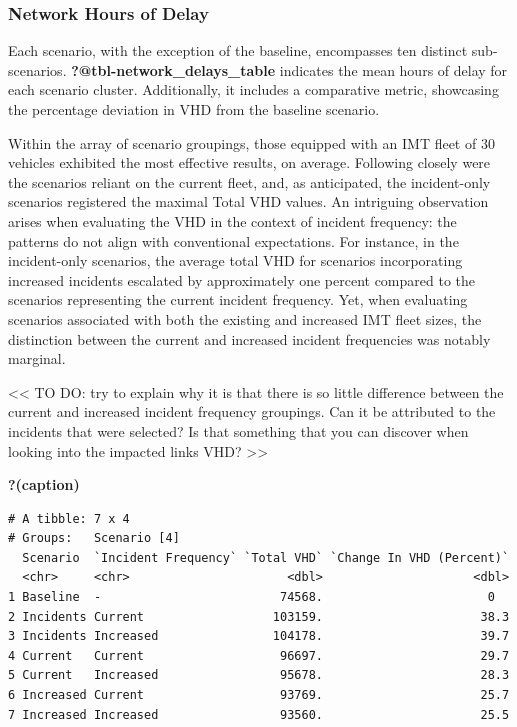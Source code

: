 \documentclass[
  letterpaper,
  authoryear]{elsarticle}
\begin{document}
\hypertarget{network-hours-of-delay}{%
\subsubsection{Network Hours of Delay}\label{network-hours-of-delay}}

Each scenario, with the exception of the baseline, encompasses ten
distinct sub-scenarios. \textbf{?@tbl-network\_delays\_table} indicates
the mean hours of delay for each scenario cluster. Additionally, it
includes a comparative metric, showcasing the percentage deviation in
VHD from the baseline scenario.

Within the array of scenario groupings, those equipped with an IMT fleet
of 30 vehicles exhibited the most effective results, on average.
Following closely were the scenarios reliant on the current fleet, and,
as anticipated, the incident-only scenarios registered the maximal Total
VHD values. An intriguing observation arises when evaluating the VHD in
the context of incident frequency: the patterns do not align with
conventional expectations. For instance, in the incident-only scenarios,
the average total VHD for scenarios incorporating increased incidents
escalated by approximately one percent compared to the scenarios
representing the current incident frequency. Yet, when evaluating
scenarios associated with both the existing and increased IMT fleet
sizes, the distinction between the current and increased incident
frequencies was notably marginal.

\textless\textless{} TO DO: try to explain why it is that there is so
little difference between the current and increased incident frequency
groupings. Can it be attributed to the incidents that were selected? Is
that something that you can discover when looking into the impacted
links VHD? \textgreater\textgreater{}

\begin{table}

\caption{\textbf{?(caption)}}\begin{minipage}[t]{\linewidth}

{\centering 

\begin{verbatim}
# A tibble: 7 x 4
# Groups:   Scenario [4]
  Scenario  `Incident Frequency` `Total VHD` `Change In VHD (Percent)`
  <chr>     <chr>                      <dbl>                     <dbl>
1 Baseline  -                         74568.                       0  
2 Incidents Current                  103159.                      38.3
3 Incidents Increased                104178.                      39.7
4 Current   Current                   96697.                      29.7
5 Current   Increased                 95678.                      28.3
6 Increased Current                   93769.                      25.7
7 Increased Increased                 93560.                      25.5
\end{verbatim}

}

\end{minipage}%

\end{table}
\end{document}

